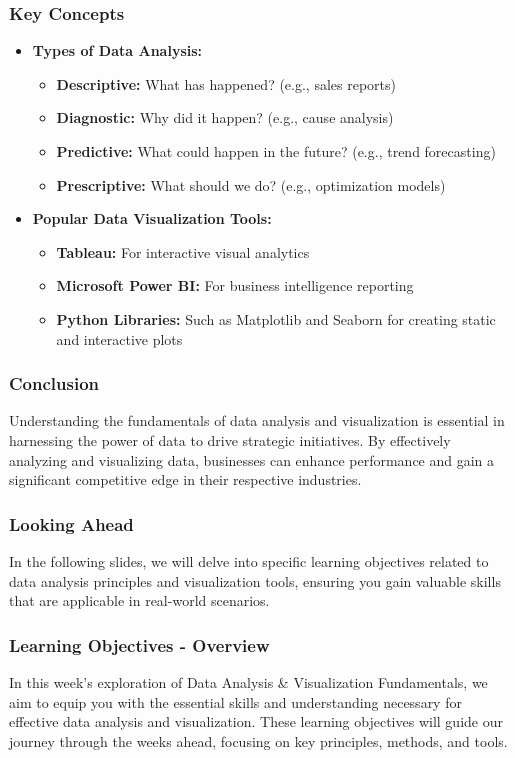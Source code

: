 \documentclass{beamer}
\begin{document}
\begin{frame}[fragile]
    \frametitle{Key Concepts}
    \begin{itemize}
        \item \textbf{Types of Data Analysis:}
        \begin{itemize}
            \item \textbf{Descriptive:} What has happened? (e.g., sales reports)
            \item \textbf{Diagnostic:} Why did it happen? (e.g., cause analysis)
            \item \textbf{Predictive:} What could happen in the future? (e.g., trend forecasting)
            \item \textbf{Prescriptive:} What should we do? (e.g., optimization models)
        \end{itemize}
        
        \item \textbf{Popular Data Visualization Tools:}
        \begin{itemize}
            \item \textbf{Tableau:} For interactive visual analytics
            \item \textbf{Microsoft Power BI:} For business intelligence reporting
            \item \textbf{Python Libraries:} Such as Matplotlib and Seaborn for creating static and interactive plots
        \end{itemize}
    \end{itemize}
\end{frame}

\begin{frame}[fragile]
    \frametitle{Conclusion}
    Understanding the fundamentals of data analysis and visualization is essential in harnessing the power of data to drive strategic initiatives. By effectively analyzing and visualizing data, businesses can enhance performance and gain a significant competitive edge in their respective industries.
\end{frame}

\begin{frame}[fragile]
    \frametitle{Looking Ahead}
    In the following slides, we will delve into specific learning objectives related to data analysis principles and visualization tools, ensuring you gain valuable skills that are applicable in real-world scenarios.
\end{frame}

\begin{frame}[fragile]
    \frametitle{Learning Objectives - Overview}
    In this week’s exploration of Data Analysis \& Visualization Fundamentals, we aim to equip you with the essential skills and understanding necessary for effective data analysis and visualization. 
    These learning objectives will guide our journey through the weeks ahead, focusing on key principles, methods, and tools.
\end{frame}
\end{document}
